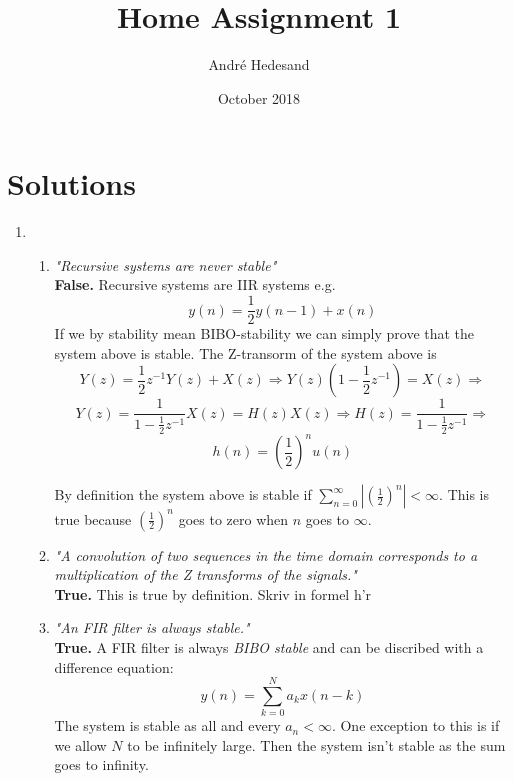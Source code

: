 \documentclass{article}
\title{Home Assignment 1}
\author{André Hedesand}
\date{October 2018}
\begin{document}
\maketitle

\section*{Solutions}

\begin{enumerate}
    \item
        \begin{enumerate}
            \item %
                \emph{"Recursive systems are never stable"}
                \\
                \textbf{False.} 
                Recursive systems are IIR systems e.g. 
                $$ y(n) = \frac{1}{2}y(n-1) + x(n) $$
                If we by stability mean BIBO-stability we can simply prove that the system above is stable. The Z-transorm of the system above is
                $$ 
                    Y(z) = \frac{1}{2}z^{-1}Y(z) + X(z) \Rightarrow
                    Y(z)(1 - \frac{1}{2}z^{-1}) = X(z) \Rightarrow
                $$
                $$
                    Y(z) = \frac{1}{1 - \frac{1}{2}z^{-1}}X(z) = 
                    H(z) X(z) \Rightarrow 
                    H(z) = \frac{1}{1 - \frac{1}{2}z^{-1}} \Rightarrow
                $$
                $$
                    h(n) = (\frac{1}{2})^{n} u(n)
                $$
                
                By definition the system above is stable if
                $ \sum_{n=0}^{\infty} |(\frac{1}{2})^{n}| < \infty $.
                This is true because $(\frac{1}{2})^{n}$ goes to zero when $n$ goes to $\infty$.
            
            \item %
                \emph{"A convolution of two sequences in the time domain corresponds to a multiplication of the Z transforms of the signals."}
                \\
                \textbf{True.} This is true by definition. Skriv in formel h'r
            
            \item %
                \emph{"An FIR filter is always stable."}
                \\
                \textbf{True.}
                A FIR filter is always \emph{BIBO stable} and can be discribed with a difference equation:
                $$ y(n) = \sum_{k=0}^{N} a_k x(n-k)$$
                The system is stable as all and every $a_n < \infty$.
                One exception to this is if we allow $N$ to be infinitely large. Then the system isn't stable as the sum goes to infinity.
                

\end{enumerate}
\end{enumerate}
\end{document}
